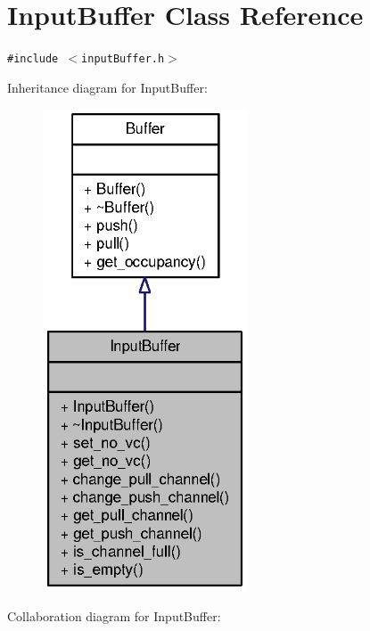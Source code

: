 \section{InputBuffer Class Reference}
\label{classInputBuffer}
{\tt \#include $<$inputBuffer.h$>$}

Inheritance diagram for InputBuffer:\nopagebreak
\begin{figure}[H]
\begin{center}
\leavevmode
\includegraphics[width=172pt]{classInputBuffer__inherit__graph}
\end{center}
\end{figure}
Collaboration diagram for InputBuffer:\nopagebreak
